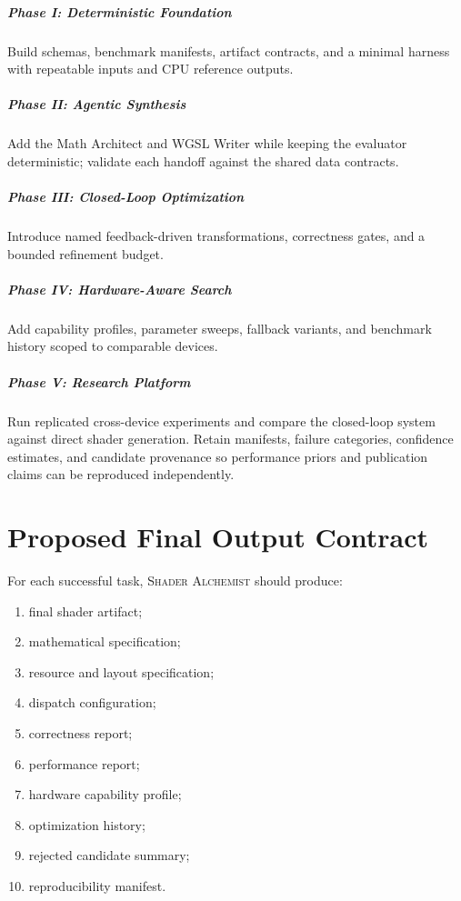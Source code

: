 \documentclass[11pt,a4paper,oneside]{report}
\newcommand{\SA}{\textsc{Shader Alchemist}}
\begin{document}
\paragraph*{Phase I: Deterministic Foundation} Build schemas, benchmark manifests, artifact
contracts, and a minimal harness with repeatable inputs and CPU reference outputs.

\paragraph*{Phase II: Agentic Synthesis} Add the Math Architect and WGSL Writer while keeping
the evaluator deterministic; validate each handoff against the shared data contracts.

\paragraph*{Phase III: Closed-Loop Optimization} Introduce named feedback-driven transformations,
correctness gates, and a bounded refinement budget.

\paragraph*{Phase IV: Hardware-Aware Search} Add capability profiles, parameter sweeps, fallback
variants, and benchmark history scoped to comparable devices.

\paragraph*{Phase V: Research Platform} Run replicated cross-device experiments and compare the
closed-loop system against direct shader generation. Retain manifests, failure categories,
confidence estimates, and candidate provenance so performance priors and publication claims can
be reproduced independently.

\chapter{Proposed Final Output Contract}

For each successful task, \SA{} should produce:

\begin{enumerate}
  \item final shader artifact;
  \item mathematical specification;
  \item resource and layout specification;
  \item dispatch configuration;
  \item correctness report;
  \item performance report;
  \item hardware capability profile;
  \item optimization history;
  \item rejected candidate summary;
  \item reproducibility manifest.
\end{enumerate}
\end{document}
